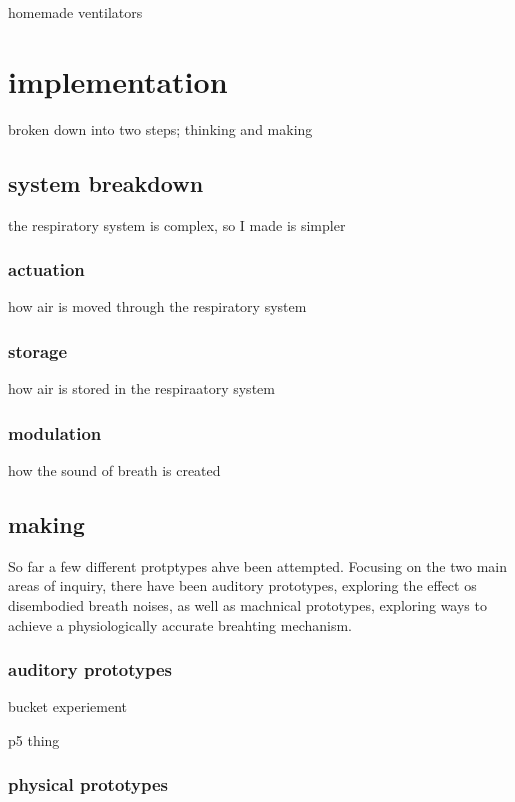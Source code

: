 \documentclass[letterpaper]{article}
\begin{document}
homemade ventilators


\section{implementation}

broken down into two steps; thinking and making

\subsection{system breakdown}

the respiratory system is complex, so I made is simpler

\subsubsection{actuation}

how air is moved through the respiratory system

\subsubsection{storage}

how air is stored in the respiraatory system

\subsubsection{modulation}

how the sound of breath is created

\subsection{making}

So far a few different protptypes ahve been attempted. Focusing on the two main areas of inquiry, there have been auditory prototypes, exploring the effect os disembodied breath noises, as well as machnical prototypes, exploring ways to achieve a physiologically accurate breahting mechanism. 

\subsubsection{auditory prototypes}

bucket experiement

p5 thing

\subsubsection{physical prototypes}
\end{document}

